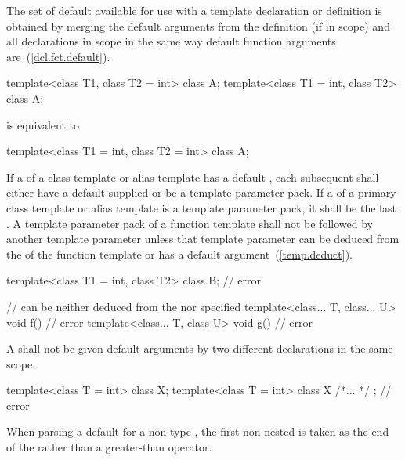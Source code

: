 \pnum
The set of default
available for use with a template
declaration or definition is obtained by merging the default arguments
from the definition (if in scope) and all declarations in scope in the
same way default function arguments are~(\ref{dcl.fct.default}).
\enterexample

\begin{codeblock}
template<class T1, class T2 = int> class A;
template<class T1 = int, class T2> class A;
\end{codeblock}

is equivalent to

\begin{codeblock}
template<class T1 = int, class T2 = int> class A;
\end{codeblock}
\exitexample

\pnum
If a
of a class template or alias template has a default
,
each subsequent
shall either have a default
supplied
or be a template parameter pack. If a 
of a primary class template or alias template is a template parameter pack, it shall be the last
.
A template parameter pack of a function template shall not be followed by
another
template parameter unless that template parameter can be deduced from the
 of the function template or has a
default argument~(\ref{temp.deduct}).
\enterexample

\begin{codeblock}
template<class T1 = int, class T2> class B;   // error

//  can be neither deduced from the  nor specified
template<class... T, class... U> void f() { } // error
template<class... T, class U> void g() { }    // error
\end{codeblock}
\exitexample

\pnum
A
shall
not be given default arguments by two different declarations in the same scope.
\enterexample

\begin{codeblock}
template<class T = int> class X;
template<class T = int> class X { /*... */ }; // error
\end{codeblock}
\exitexample

%
\pnum
When parsing a
default
for a non-type
,
the first non-nested
\tcode{>}
is taken as the end of the
rather than a greater-than operator.
\enterexample

